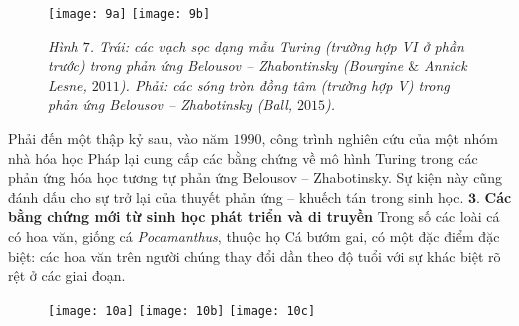 \begin{multicols}{2}
	\begin{figure}[H]
		\vspace*{-5pt}
		\centering
		\captionsetup{labelformat= empty, justification=centering}
		\texttt{[image: 9a]}\quad
		\texttt{[image: 9b]}
		\caption{\small\textit{\color{timhieukhoahoc}Hình $7$. Trái: các vạch sọc dạng mẫu Turing (trường hợp VI ở phần trước) trong phản ứng Belousov -- Zhabontinsky (Bourgine $\&$ Annick Lesne, $2011$). Phải: các sóng tròn đồng tâm (trường hợp V) trong phản ứng Belousov -- Zhabotinsky (Ball, $2015$).}}
		\vspace*{-10pt}
	\end{figure}
	Phải đến một thập kỷ sau, vào năm $1990$, công trình nghiên cứu của một nhóm nhà hóa học Pháp lại cung cấp các bằng chứng về mô hình Turing trong các phản ứng hóa học tương tự phản ứng Belousov -- Zhabotinsky. Sự kiện này cũng đánh dấu cho sự trở lại của thuyết phản ứng -- khuếch tán trong sinh học.
	\vskip 0.05cm
	$\pmb{3.}$ \textbf{\color{timhieukhoahoc}Các bằng chứng mới từ sinh học phát triển và di truyền}
	\vskip 0.05cm
	Trong số các loài cá có hoa văn, giống cá \textit{Pocamanthus}, thuộc họ Cá bướm gai, có một đặc điểm đặc biệt: các hoa văn trên người chúng thay đổi dần theo độ tuổi với sự khác biệt rõ rệt ở các giai đoạn.
	\begin{figure}[H]
		\vspace*{-5pt}
		\centering
		\captionsetup{labelformat= empty, justification=centering}
		\texttt{[image: 10a]}
		\texttt{[image: 10b]}
		\texttt{[image: 10c]}\\
		

\end{figure}
\end{multicols}
